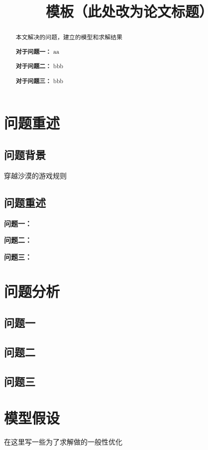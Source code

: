 \documentclass[withoutpreface,bwprint]{cumcmthesis} %
\title{模板（此处改为论文标题）}
\begin{document}
\maketitle %

\begin{abstract} %
    本文解决的问题，建立的模型和求解结果

    \textbf{对于问题一：} aa

    \textbf{对于问题二：} bbb

    \textbf{对于问题三：} bbb

\end{abstract}

\section{问题重述}
\subsection{问题背景}

穿越沙漠的游戏规则

\subsection{问题重述}

\quad \textbf{问题一：}

\quad \textbf{问题二：}

\quad \textbf{问题三：}

\section{问题分析}
\subsection{问题一}

\subsection{问题二}

\subsection{问题三}

\section{模型假设}
在这里写一些为了求解做的一般性优化
\end{document}
